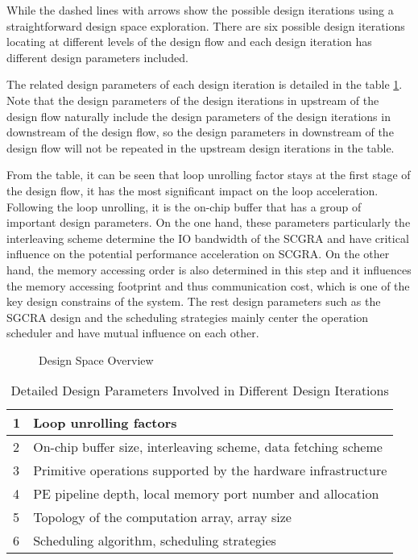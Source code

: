 \documentclass[12pt]{article} %
\begin{document}
While the dashed lines with arrows show the possible design iterations using a straightforward
design space exploration. There are six possible design iterations locating at different levels of the design
flow and each design iteration has different design parameters included. 

The related design parameters of each design iteration is detailed in the 
table \ref{tab:detailed-design-parameter}. Note that the design 
parameters of the design iterations in upstream of the design flow naturally include the design parameters of the design
iterations in downstream of the design flow, so the design parameters in downstream of the design flow
will not be repeated in the upstream design iterations in the table. 

From the table, it can be seen
that loop unrolling factor stays at the first stage of the design flow, it has the most significant
impact on the loop acceleration. Following the loop unrolling, it is the on-chip buffer that has a group of
important design parameters. On the one hand, these parameters particularly the interleaving scheme determine 
the IO bandwidth of the SCGRA and have critical influence on the potential performance acceleration on SCGRA. 
On the other hand, the memory accessing order is also determined in this step and it influences the
memory accessing footprint and thus communication cost, which is one of the key design constrains of
the system. The rest design parameters such as the SGCRA design and the scheduling strategies mainly 
center the operation scheduler and have mutual influence on each other.

\begin{figure}[H]
\caption{Design Space Overview}
\label{fig:design-space-overview}
\end{figure}

\begin{table}[H]
\caption{Detailed Design Parameters Involved in Different Design Iterations}
\label{tab:detailed-design-parameter}
\centering
\begin{tabular}{|p{0.8cm}|p{12cm}|}
\hline
1 & {Loop unrolling factors}\\

\hline
2 & {On-chip buffer size, interleaving scheme, data fetching scheme}\\

\hline
3 & {Primitive operations supported by the hardware infrastructure}\\

\hline
4 & {PE pipeline depth, local memory port number and allocation}\\

\hline
5 & {Topology of the computation array, array size}\\

\hline
6 & {Scheduling algorithm, scheduling strategies}\\

\hline
\end{tabular}
\end{table}
\end{document}
